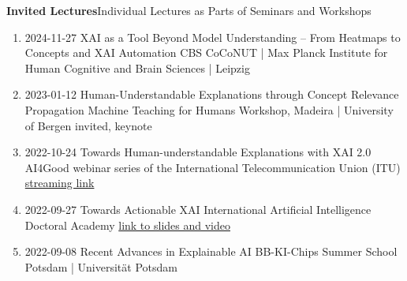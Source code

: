 \headedsection
{\bf Invited Lectures}{Individual Lectures as Parts of Seminars and Workshops}
{
\begin{enumerate}
    \item {}
                    {2024-11-27}
                    {XAI as a Tool Beyond Model Understanding -- From Heatmaps to Concepts and XAI Automation}
                    {CBS CoCoNUT | Max Planck Institute for Human Cognitive and Brain Sciences | Leipzig}
    \item {}
                    {2023-01-12}
                    {Human-Understandable Explanations through Concept Relevance Propagation}
                    {Machine Teaching for Humans Workshop, Madeira | University of Bergen}
                    {invited, keynote}
    \item {}
                    {2022-10-24}
                    {Towards Human-understandable Explanations with XAI 2.0}
                    {AI4Good webinar series of the International Telecommunication Union (ITU)}
                    {\href{https://www.youtube.com/watch?v=NiE13aBBx28}{streaming link}}
    \item {}
                    {2022-09-27}
                    {Towards Actionable XAI}
                    {International Artificial Intelligence Doctoral Academy}
                    {\href{https://www.i-aida.org/events/towards-actionable-xai-2/}{link to slides and video}}
    \item {}
                    {2022-09-08}
                    {Recent Advances in Explainable AI}
                    {BB-KI-Chips Summer School Potsdam | Universität Potsdam}

\end{enumerate}}
